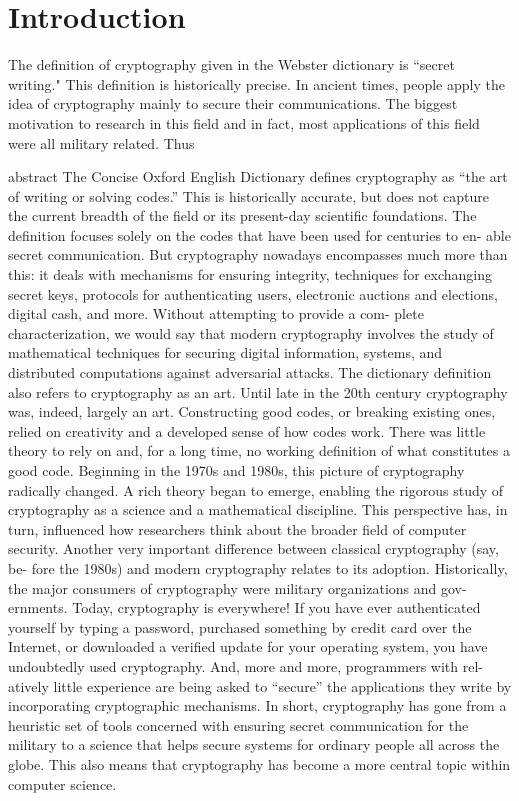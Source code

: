 \chapter{Introduction}
The definition of cryptography given in the Webster dictionary is ``secret writing." This definition is historically precise. In ancient times, people apply the idea of cryptography mainly to secure their communications. The biggest motivation to research in this field and in fact, most applications of this field were all military related. Thus


abstract
The Concise Oxford English Dictionary defines cryptography as “the art of
writing or solving codes.” This is historically accurate, but does not capture
the current breadth of the field or its present-day scientific foundations. The
definition focuses solely on the codes that have been used for centuries to en-
able secret communication. But cryptography nowadays encompasses much
more than this: it deals with mechanisms for ensuring integrity, techniques for
exchanging secret keys, protocols for authenticating users, electronic auctions
and elections, digital cash, and more. Without attempting to provide a com-
plete characterization, we would say that modern cryptography involves the
study of mathematical techniques for securing digital information, systems,
and distributed computations against adversarial attacks.
The dictionary definition also refers to cryptography as an art. Until late in
the 20th century cryptography was, indeed, largely an art. Constructing good
codes, or breaking existing ones, relied on creativity and a developed sense of
how codes work. There was little theory to rely on and, for a long time, no
working definition of what constitutes a good code. Beginning in the 1970s
and 1980s, this picture of cryptography radically changed. A rich theory
began to emerge, enabling the rigorous study of cryptography as a science
and a mathematical discipline. This perspective has, in turn, influenced how
researchers think about the broader field of computer security.
Another very important difference between classical cryptography (say, be-
fore the 1980s) and modern cryptography relates to its adoption. Historically,
the major consumers of cryptography were military organizations and gov-
ernments. Today, cryptography is everywhere! If you have ever authenticated
yourself by typing a password, purchased something by credit card over the
Internet, or downloaded a verified update for your operating system, you have
undoubtedly used cryptography. And, more and more, programmers with rel-
atively little experience are being asked to “secure” the applications they write
by incorporating cryptographic mechanisms.
In short, cryptography has gone from a heuristic set of tools concerned
with ensuring secret communication for the military to a science that helps
secure systems for ordinary people all across the globe. This also means that
cryptography has become a more central topic within computer science.
